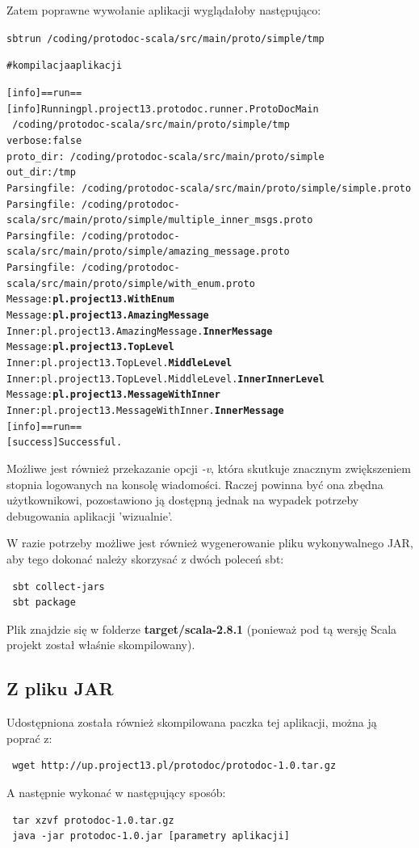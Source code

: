 \documentclass[a4paper]{article}
\begin{document}
Zatem poprawne wywołanie aplikacji wyglądałoby następująco: 
\begin{alltt}
 sbt run ~/coding/protodoc-scala/src/main/proto/simple /tmp

 # kompilacja aplikacji

[info] == run ==
[info] Running pl.project13.protodoc.runner.ProtoDocMain 
                        ~/coding/protodoc-scala/src/main/proto/simple /tmp
verbose: false
proto_dir: ~/coding/protodoc-scala/src/main/proto/simple
out_dir: /tmp
Parsing file: ~/coding/protodoc-scala/src/main/proto/simple/simple.proto
Parsing file: ~/coding/protodoc-scala/src/main/proto/simple/multiple_inner_msgs.proto
Parsing file: ~/coding/protodoc-scala/src/main/proto/simple/amazing_message.proto
Parsing file: ~/coding/protodoc-scala/src/main/proto/simple/with_enum.proto
Message: \textbf{pl.project13.WithEnum}
Message: \textbf{pl.project13.AmazingMessage}
Inner:   pl.project13.AmazingMessage.\textbf{InnerMessage}
Message: \textbf{pl.project13.TopLevel}
Inner:   pl.project13.TopLevel.\textbf{MiddleLevel}
Inner:   pl.project13.TopLevel.MiddleLevel.\textbf{InnerInnerLevel}
Message: \textbf{pl.project13.MessageWithInner}
Inner:   pl.project13.MessageWithInner.\textbf{InnerMessage}
[info] == run ==
[success] \textcolor{OliveGreen}{Successful.}
\end{alltt}

Możliwe jest również przekazanie opcji \textit{-v}, która skutkuje znacznym zwiększeniem stopnia logowanych na konsolę wiadomości.
Raczej powinna być ona zbędna użytkownikowi, pozostawiono ją dostępną jednak na wypadek potrzeby debugowania aplikacji 'wizualnie'.

W razie potrzeby możliwe jest również wygenerowanie pliku wykonywalnego JAR, aby tego dokonać należy skorzysać z dwóch poleceń sbt:
\begin{verbatim}
 sbt collect-jars
 sbt package
\end{verbatim}
Plik znajdzie się w folderze \textbf{target/scala-2.8.1} (ponieważ pod tą wersję Scala projekt został właśnie skompilowany).

\subsection{Z pliku JAR}
Udostępniona została również skompilowana paczka tej aplikacji, można ją poprać z:
\begin{verbatim}
 wget http://up.project13.pl/protodoc/protodoc-1.0.tar.gz
\end{verbatim}
A następnie wykonać w następujący sposób:
\begin{verbatim}
 tar xzvf protodoc-1.0.tar.gz
 java -jar protodoc-1.0.jar [parametry aplikacji]
\end{verbatim}
\end{document}
